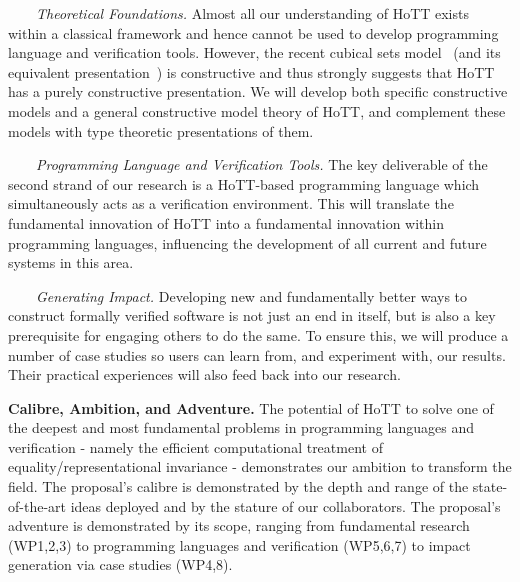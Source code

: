 \documentclass[a4paper,11pt]{article}
\begin{document}



$\;\;\; \;\;\;$ {\em Theoretical Foundations.} Almost all our
understanding of HoTT exists within a classical framework and hence
cannot be used to develop programming language and verification
tools. However, the recent cubical sets model~\cite{BezemM:cubsmt} (and its equivalent presentation~\cite{nominal})
is constructive and thus strongly suggests
that HoTT has a
purely constructive presentation. We will develop
both specific constructive 
models 
and a general constructive model theory 
of HoTT, and complement these models with type theoretic
presentations of them.

$\;\;\;\;\;\;$ {\em Programming Language and Verification Tools.} The key
  deliverable of the second strand of our research is a HoTT-based
  programming language which simultaneously acts as a verification
  environment. This will translate the fundamental innovation of HoTT
  into a fundamental innovation within programming languages,
  influencing the development of all current and future systems in this area.

$\;\;\;\;\;\;$ {\em Generating Impact.} Developing new and fundamentally
  better ways to construct formally verified software is not just an
  end in itself, but is also a key prerequisite for engaging others to
  do the same.  To ensure this, we will produce a number of case studies so
  users can learn from, and experiment with, our results. Their
  practical experiences will also feed back into our research.

  {\bf Calibre, Ambition, and Adventure.} The potential of HoTT to
  solve one of the deepest and most fundamental problems in
  programming languages and verification - namely the efficient
  computational treatment of equality/representational invariance -
  demonstrates our ambition to transform the field. The proposal's calibre is demonstrated by
  the depth and range of the state-of-the-art ideas deployed and by the
  stature of our collaborators. The
  proposal's adventure is demonstrated by its scope, ranging from
  fundamental research (WP1,2,3) to programming languages and
  verification (WP5,6,7) to impact generation via case studies
  (WP4,8).
\end{document}
